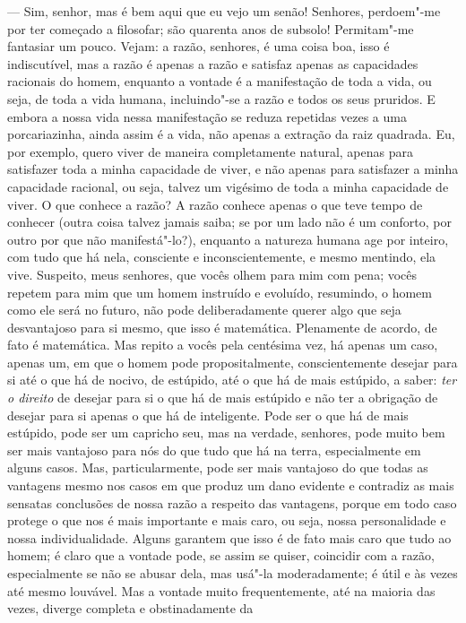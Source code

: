 --- Sim, senhor, mas é bem aqui que eu vejo um senão! Senhores, perdoem"-me por
ter começado a filosofar; são quarenta anos de subsolo! Permitam"-me fantasiar
um pouco. Vejam: a razão, senhores, é uma coisa boa, isso é indiscutível, mas a
razão é apenas a razão e satisfaz apenas as capacidades racionais do homem,
enquanto a vontade é a manifestação de toda a vida, ou seja, de toda a vida
humana, incluindo"-se a razão e todos os seus pruridos. E embora a nossa vida
nessa manifestação se reduza repetidas vezes a uma porcariazinha, ainda assim é
a vida, não apenas a extração da raiz quadrada. Eu, por exemplo, quero viver de
maneira completamente natural, apenas para satisfazer toda a minha capacidade
de viver, e não apenas para satisfazer a minha capacidade racional, ou seja,
talvez um vigésimo de toda a minha capacidade de viver. O que conhece a razão?
A razão conhece apenas o que teve tempo de conhecer (outra coisa talvez jamais
saiba; se por um lado não é um conforto, por outro por que não manifestá"-lo?),
enquanto a natureza humana age por inteiro, com tudo que há nela, consciente e
inconscientemente, e mesmo mentindo, ela vive. Suspeito, meus senhores, que
vocês olhem para mim com pena; vocês repetem para mim que um homem instruído e
evoluído, resumindo, o homem como ele será no futuro, não pode deliberadamente
querer algo que seja desvantajoso para si mesmo, que isso é matemática.
Plenamente de acordo, de fato é matemática. Mas repito a vocês pela centésima
vez, há apenas um caso, apenas um, em que o homem pode propositalmente,
conscientemente desejar para si até o que há de nocivo, de estúpido, até o que
há de mais estúpido, a saber: \textit{ter o direito} de desejar para si o que
há de mais estúpido e não ter a obrigação de desejar para si apenas o que há de
inteligente. Pode ser o que há de mais estúpido, pode ser um capricho seu, mas
na verdade, senhores, pode muito bem ser mais vantajoso para nós do que tudo
que há na terra, especialmente em alguns casos. Mas, particularmente, pode ser
mais vantajoso do que todas as vantagens mesmo nos casos em que produz um dano
evidente e contradiz as mais sensatas conclusões de nossa razão a respeito das
vantagens, porque em todo caso protege o que nos é mais importante e mais caro,
ou seja, nossa personalidade e nossa individualidade. Alguns garantem que isso
é de fato mais caro que tudo ao homem; é claro que a vontade pode, se assim se
quiser, coincidir com a razão, especialmente se não se abusar dela, mas usá"-la
moderadamente; é útil e às vezes até mesmo louvável. Mas a vontade muito
frequentemente, até na maioria das vezes, diverge completa e obstinadamente da
